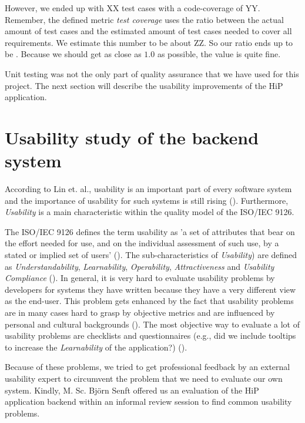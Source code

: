 However, we ended up with XX test cases with a code-coverage of YY. Remember, the defined metric \emph{test coverage} uses the ratio between the actual amount of test cases and the estimated amount of test cases needed to cover all requirements. We estimate this number to be about ZZ. So our ratio ends up to be . Because we should get as close as $1.0$ as possible, the value is quite fine.

Unit testing was not the only part of quality assurance that we have used for this project. The next section will describe the usability improvements of the \ac{HiP} application.

\section{Usability study of the backend system}
According to Lin et. al., usability is an important part of every software system and the importance of usability for such systems is still rising (\cite{lin1997proposed}). Furthermore, \emph{Usability} is a main characteristic within the quality model of the ISO/IEC 9126.

The ISO/IEC 9126 defines the term usability as 'a set of attributes that bear on the effort needed for use, and on the individual assessment of such use, by a stated or implied set of users' (\cite{bevan1997quality}). The sub-characteristics of \emph{Usability}) are defined as \emph{Understandability}, \emph{Learnability}, \emph{Operability}, \emph{Attractiveness} and \emph{Usability Compliance} (\cite{bevan1997quality}). In general, it is very hard to evaluate usability problems by developers for systems they have written because they have a very different view as the end-user. This problem gets enhanced by the fact that usability problems are in many cases hard to grasp by objective metrics and are influenced by personal and cultural backgrounds (\cite{herman1996towards}). The most objective way to evaluate a lot of usability problems are checklists and questionnaires (e.g., did we include tooltips to increase the \emph{Learnability} of the application?) (\cite{shamsuddin2014capturing}). 

Because of these problems, we tried to get professional feedback by an external usability expert to circumvent the problem that we need to evaluate our own system. Kindly, M. Sc. Bj\"orn Senft offered us an evaluation of the \ac{HiP} application backend within an informal review session to find common usability problems. 

